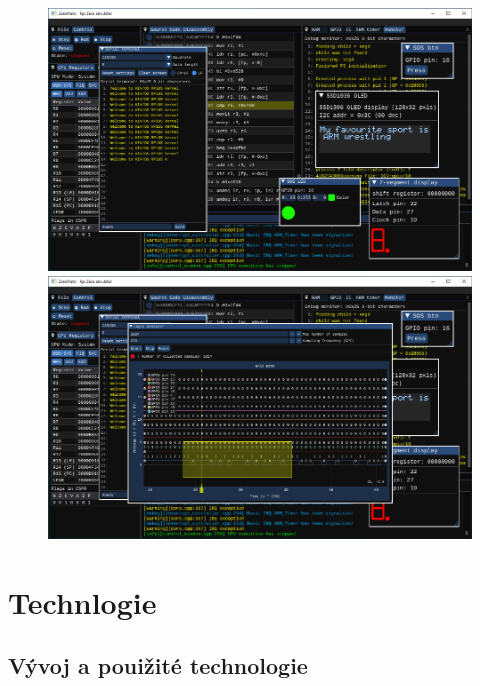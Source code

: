 \documentclass[compress]{beamer}
\begin{document}
\begin{frame}
\begin{overlayarea}{\textwidth}{\textheight}
\begin{figure}
{			}%
			\only<5>
			{%
				\includegraphics[width=.85\textwidth]{img/screenshot-06.pdf}%
			}%
			\only<6>
			{%
				\includegraphics[width=.85\textwidth]{img/screenshot-07.pdf}%
			}%
		\end{figure}
	\end{overlayarea}      
\end{frame}

\section{Technlogie}

\subsection{Vývoj a pouižité technologie}
\end{document}

